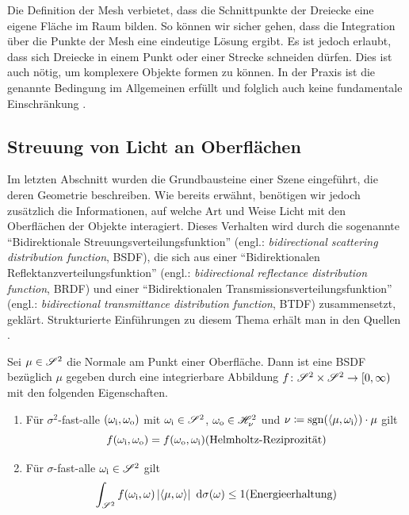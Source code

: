 		Die Definition der Mesh verbietet, dass die Schnittpunkte der Dreiecke eine eigene Fläche im Raum bilden.
		So können wir sicher gehen, dass die Integration über die Punkte der Mesh eine eindeutige Lösung ergibt.
		Es ist jedoch erlaubt, dass sich Dreiecke in einem Punkt oder einer Strecke schneiden dürfen.
		Dies ist auch nötig, um komplexere Objekte formen zu können.
		In der Praxis ist die genannte Bedingung im Allgemeinen erfüllt und folglich auch keine fundamentale Einschränkung \cite{pbrt3,course-triangle-mesh,surface-triangle-mesh,veach-thesis}.


	\subsection{Streuung von Licht an Oberflächen} %
	\label{sub:bsdf}

		Im letzten Abschnitt wurden die Grundbausteine einer Szene eingeführt, die deren Geometrie beschreiben.
		Wie bereits erwähnt, benötigen wir jedoch zusätzlich die Informationen, auf welche Art und Weise Licht mit den Oberflächen der Objekte interagiert.
		Dieses Verhalten wird durch die sogenannte \enquote{Bidirektionale Streuungsverteilungsfunktion} (engl.: \textit{bidirectional scattering distribution function}, BSDF), die sich aus einer \enquote{Bidirektionalen Reflektanzverteilungsfunktion} (engl.: \textit{bidirectional reflectance distribution function}, BRDF) und einer \enquote{Bidirektionalen Transmissionsverteilungsfunktion} (engl.: \textit{bidirectional transmittance distribution function}, BTDF) zusammensetzt, geklärt.
		Strukturierte Einführungen zu diesem Thema erhält man in den Quellen \cite{pbrt3,veach-thesis,real-time-render,intro-brdf,radiosity}.
		\begin{definition}
			Sei $\mu\in\mathscr{S}^{2}$ die Normale am Punkt einer Oberfläche.
			Dann ist eine BSDF bezüglich $\mu$ gegeben durch eine integrierbare Abbildung $f\colon\mathscr{S}^{2}\times\mathscr{S}^{2}\to[0,\infty)$ mit den folgenden Eigenschaften.

			\begin{enumerate}[label = \normalfont{(\roman*)}]
				\item
				Für $\sigma^2$-fast-alle $(\omega_{\mathrm{i}},\omega_{\mathrm{o}})$ mit $\omega_{\mathrm{i}}\in\mathscr{S}^{2}$, $\omega_{\mathrm{o}}\in\mathscr{H}^{2}_{\nu}$ und $\nu\coloneqq\operatorname{sgn}(\left\langle \mu,\omega_{\mathrm{i}} \right\rangle)\cdot\mu$ gilt
				\[
					f(\omega_\m{i},\omega_\m{o}) = f(\omega_\m{o},\omega_\m{i}) \hfill \text{(Helmholtz-Reziprozität)}
				\]

				\item
				Für $\sigma$-fast-alle $\omega_{\mathrm{i}}\in\mathscr{S}^{2}$ gilt
				\[
					\integral{\ssp}{}{f(\omega_\m{i},\omega) \abs{\dotp{\mu}{\omega}}}{\sigma(\omega)} \leq 1 \hfill \text{(Energieerhaltung)}
				\]
			\end{enumerate}
		\end{definition}

